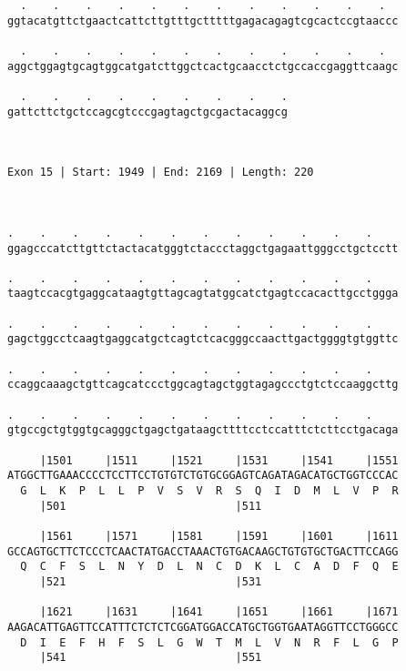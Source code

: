 \documentclass{article}
\begin{document}
\begin{Verbatim}
  .    .    .    .    .    .    .    .    .    .    .    .  
ggtacatgttctgaactcattcttgtttgctttttgagacagagtcgcactccgtaaccc
                                                            
  .    .    .    .    .    .    .    .    .    .    .    .  
aggctggagtgcagtggcatgatcttggctcactgcaacctctgccaccgaggttcaagc
                                                            
  .    .    .    .    .    .    .    .    .
gattcttctgctccagcgtcccgagtagctgcgactacaggcg
                                           
                                           
 
Exon 15 | Start: 1949 | End: 2169 | Length: 220



.    .    .    .    .    .    .    .    .    .    .    .    
ggagcccatcttgttctactacatgggtctaccctaggctgagaattgggcctgctcctt
                                                            
.    .    .    .    .    .    .    .    .    .    .    .    
taagtccacgtgaggcataagtgttagcagtatggcatctgagtccacacttgcctggga
                                                            
.    .    .    .    .    .    .    .    .    .    .    .    
gagctggcctcaagtgaggcatgctcagtctcacgggccaacttgactggggtgtggttc
                                                            
.    .    .    .    .    .    .    .    .    .    .    .    
ccaggcaaagctgttcagcatccctggcagtagctggtagagccctgtctccaaggcttg
                                                            
.    .    .    .    .    .    .    .    .    .    .    .    
gtgccgctgtggtgcagggctgagctgataagcttttcctccatttctcttcctgacaga
                                                            
     |1501     |1511     |1521     |1531     |1541     |1551
ATGGCTTGAAACCCCTCCTTCCTGTGTCTGTGCGGAGTCAGATAGACATGCTGGTCCCAC
  G  L  K  P  L  L  P  V  S  V  R  S  Q  I  D  M  L  V  P  R
     |501                          |511                     
  
     |1561     |1571     |1581     |1591     |1601     |1611
GCCAGTGCTTCTCCCTCAACTATGACCTAAACTGTGACAAGCTGTGTGCTGACTTCCAGG
  Q  C  F  S  L  N  Y  D  L  N  C  D  K  L  C  A  D  F  Q  E
     |521                          |531                     
  
     |1621     |1631     |1641     |1651     |1661     |1671
AAGACATTGAGTTCCATTTCTCTCTCGGATGGACCATGCTGGTGAATAGGTTCCTGGGCC
  D  I  E  F  H  F  S  L  G  W  T  M  L  V  N  R  F  L  G  P
     |541                          |551                     
  

\end{Verbatim}
\end{document}
